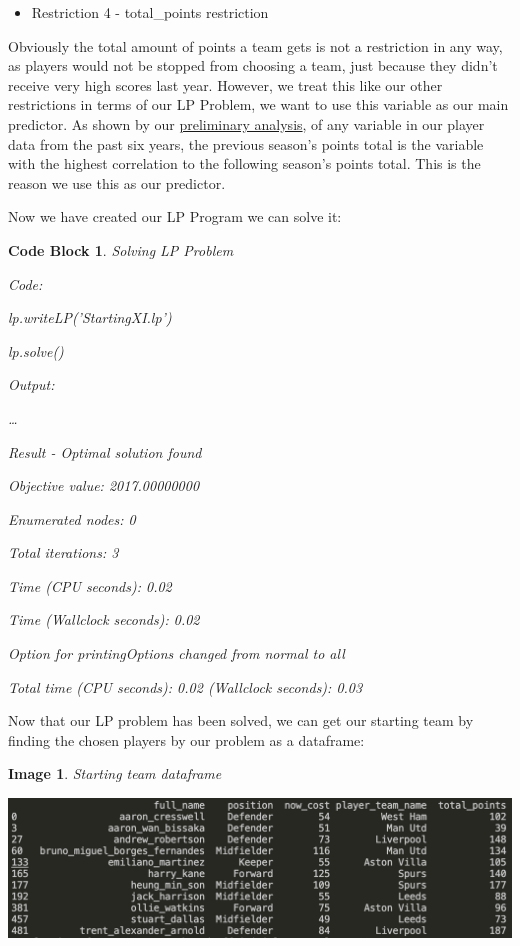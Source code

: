 \documentclass[12pt, a4paper, oneside]{book}
\newtheorem{image}[theorem]{Image}
\newtheorem{codeblock}[theorem]{Code Block}
\numberwithin{equation}{section}
\begin{document}
\vspace{0.5cm}

\begin{itemize}
  \item Restriction 4 - total\_points restriction
\end{itemize}

Obviously the total amount of points a team gets is not a restriction in any way, as players would not be stopped from choosing a team, just because they didn't receive very high scores last year. However, we treat this like our other restrictions in terms of our LP Problem, we want to use this variable as our main predictor. As shown by our \hyperref[total points correlation]{preliminary analysis}, of any variable in our player data from the past six years, the previous season's points total is the variable with the highest correlation to the following season's points total. This is the reason we use this as our predictor.

\vspace{0.5cm}

Now we have created our LP Program we can solve it:

\begin{codeblock}
  Solving LP Problem
  
  Code:

  lp.writeLP('StartingXI.lp')
  
  lp.solve()

  Output:

  \dots

  Result - Optimal solution found

  Objective value:                2017.00000000
  
  Enumerated nodes:               0
  
  Total iterations:               3
  
  Time (CPU seconds):             0.02
  
  Time (Wallclock seconds):       0.02

  Option for printingOptions changed from normal to all
  
  Total time (CPU seconds):       0.02   (Wallclock seconds):       0.03
\end{codeblock}

Now that our LP problem has been solved, we can get our starting team by finding the chosen players by our problem as a dataframe:

\begin{image} \label{starting team}
  Starting team dataframe

  \vspace{0.5cm}

  \centerline{\includegraphics[width=1\textwidth]{images/prediction/starting-team/starting-xi.png}}
\end{image}
\end{document}
